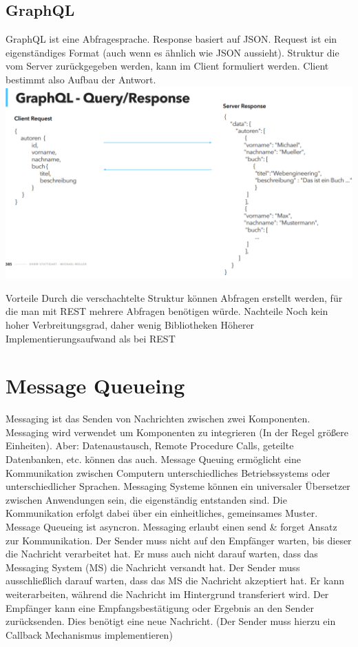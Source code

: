 \documentclass[12pt,a4paper]{article}
\begin{document}
\subsection{GraphQL}
GraphQL ist eine Abfragesprache. Response basiert auf JSON. Request ist ein eigenständiges Format (auch wenn es ähnlich wie JSON aussieht). Struktur die vom Server zurückgegeben werden, kann im Client formuliert werden. Client bestimmt also Aufbau der Antwort.\\
\includegraphics[width=\textwidth]{Bilder/graphql.PNG}
\begin{outline}
	\1 Vorteile
		\2 Durch die verschachtelte Struktur können Abfragen erstellt werden, für die man mit REST mehrere Abfragen benötigen würde.
	\1 Nachteile
		\2 Noch kein hoher Verbreitungsgrad, daher wenig Bibliotheken
		\2 Höherer Implementierungsaufwand als bei REST
\end{outline}

\section{Message Queueing}
Messaging ist das Senden von Nachrichten zwischen zwei Komponenten. Messaging wird verwendet um Komponenten zu integrieren (In der Regel größere Einheiten). Aber: Datenaustausch, Remote Procedure Calls, geteilte Datenbanken, etc. können das auch. Message Queuing ermöglicht eine Kommunikation zwischen Computern unterschiedliches Betriebssystems oder unterschiedlicher Sprachen. Messaging Systeme können ein universaler Übersetzer zwischen Anwendungen sein, die eigenständig entstanden sind. Die Kommunikation erfolgt dabei über ein einheitliches, gemeinsames Muster. Message Queueing ist asyncron. Messaging erlaubt einen send \& forget Ansatz zur Kommunikation. Der Sender muss nicht auf den Empfänger warten, bis dieser die Nachricht verarbeitet hat. Er muss auch nicht darauf warten, dass das Messaging System (MS) die Nachricht versandt hat. Der Sender muss ausschließlich darauf warten, dass das MS die Nachricht akzeptiert hat. Er kann weiterarbeiten, während die Nachricht im Hintergrund transferiert wird. Der Empfänger kann eine Empfangsbestätigung oder Ergebnis an den Sender zurücksenden. Dies benötigt eine neue Nachricht. (Der Sender muss hierzu ein Callback Mechanismus implementieren)
\end{document}
